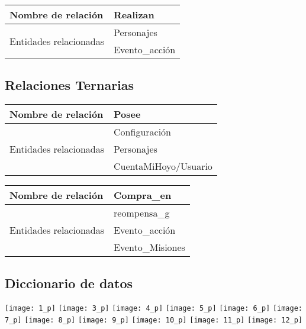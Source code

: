 \documentclass{report}
\begin{document}
\hfill

\begin{center}    
    \begin{tabular}{|p{3cm}|p{5cm}|}
    \hline
    Nombre de relación& Realizan\\ 
    \hline
    \hline
    \multirow{2}{6em}{Entidades relacionadas}& Personajes \\ &Evento\_acción\\ 
    \hline
    \end{tabular}
\end{center}

\subsection{Relaciones Ternarias}
\begin{center}    
    \begin{tabular}{|p{3cm}|p{5cm}|}
    \hline
    Nombre de relación& Posee\\ 
    \hline
    \hline
    \multirow{3}{6em}{Entidades relacionadas}& Configuración \\ &Personajes \\ &CuentaMiHoyo/Usuario\\ 
    \hline
    \end{tabular}
\end{center}

\begin{center}    
    \begin{tabular}{|p{3cm}|p{5cm}|}
    \hline
    Nombre de relación& Compra\_en\\ 
    \hline
    \hline
    \multirow{3}{6em}{Entidades relacionadas}& reompensa\_g \\ &Evento\_acción \\ &Evento\_Misiones\\ 
    \hline
    \end{tabular}
\end{center}

\subsection{Diccionario de datos}
\texttt{[image: 1\_p]}
\newpage
\texttt{[image: 3\_p]}
\texttt{[image: 4\_p]}
\newpage
\texttt{[image: 5\_p]}
\texttt{[image: 6\_p]}
\newpage
\texttt{[image: 7\_p]}
\texttt{[image: 8\_p]}
\newpage
\texttt{[image: 9\_p]}
\texttt{[image: 10\_p]}
\newpage
\texttt{[image: 11\_p]}
\texttt{[image: 12\_p]}
\end{document}
